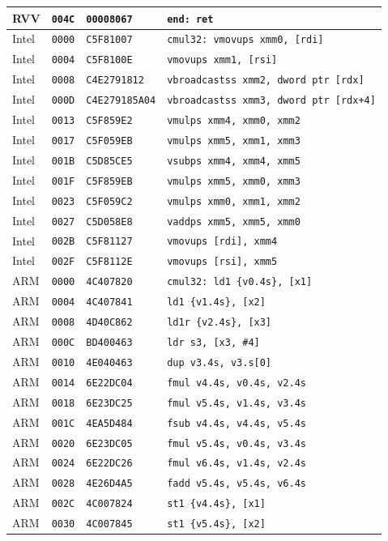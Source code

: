 \begin{table}[htbp]
\begin{tabular}{@{}l|l|l|p{7.2cm}@{}}
RVV & \texttt{004C} & \texttt{00008067} & \texttt{end: ret} \\
\midrule
Intel & \texttt{0000} & \texttt{C5F81007} & \texttt{cmul32: vmovups xmm0, [rdi]} \\
Intel & \texttt{0004} & \texttt{C5F8100E} & \texttt{vmovups xmm1, [rsi]} \\
Intel & \texttt{0008} & \texttt{C4E2791812} & \texttt{vbroadcastss xmm2, dword ptr [rdx]} \\
Intel & \texttt{000D} & \texttt{C4E279185A04} & \texttt{vbroadcastss xmm3, dword ptr [rdx+4]} \\
Intel & \texttt{0013} & \texttt{C5F859E2} & \texttt{vmulps xmm4, xmm0, xmm2} \\
Intel & \texttt{0017} & \texttt{C5F059EB} & \texttt{vmulps xmm5, xmm1, xmm3} \\
Intel & \texttt{001B} & \texttt{C5D85CE5} & \texttt{vsubps xmm4, xmm4, xmm5} \\
Intel & \texttt{001F} & \texttt{C5F859EB} & \texttt{vmulps xmm5, xmm0, xmm3} \\
Intel & \texttt{0023} & \texttt{C5F059C2} & \texttt{vmulps xmm0, xmm1, xmm2} \\
Intel & \texttt{0027} & \texttt{C5D058E8} & \texttt{vaddps xmm5, xmm5, xmm0} \\
Intel & \texttt{002B} & \texttt{C5F81127} & \texttt{vmovups [rdi], xmm4} \\
Intel & \texttt{002F} & \texttt{C5F8112E} & \texttt{vmovups [rsi], xmm5} \\
\midrule
ARM & \texttt{0000} & \texttt{4C407820} & \texttt{cmul32: ld1 \{v0.4s\}, [x1]} \\
ARM & \texttt{0004} & \texttt{4C407841} & \texttt{ld1 \{v1.4s\}, [x2]} \\
ARM & \texttt{0008} & \texttt{4D40C862} & \texttt{ld1r \{v2.4s\}, [x3]} \\
ARM & \texttt{000C} & \texttt{BD400463} & \texttt{ldr s3, [x3, \#4]} \\
ARM & \texttt{0010} & \texttt{4E040463} & \texttt{dup v3.4s, v3.s[0]} \\
ARM & \texttt{0014} & \texttt{6E22DC04} & \texttt{fmul v4.4s, v0.4s, v2.4s} \\
ARM & \texttt{0018} & \texttt{6E23DC25} & \texttt{fmul v5.4s, v1.4s, v3.4s} \\
ARM & \texttt{001C} & \texttt{4EA5D484} & \texttt{fsub v4.4s, v4.4s, v5.4s} \\
ARM & \texttt{0020} & \texttt{6E23DC05} & \texttt{fmul v5.4s, v0.4s, v3.4s} \\
ARM & \texttt{0024} & \texttt{6E22DC26} & \texttt{fmul v6.4s, v1.4s, v2.4s} \\
ARM & \texttt{0028} & \texttt{4E26D4A5} & \texttt{fadd v5.4s, v5.4s, v6.4s} \\
ARM & \texttt{002C} & \texttt{4C007824} & \texttt{st1 \{v4.4s\}, [x1]} \\
ARM & \texttt{0030} & \texttt{4C007845} & \texttt{st1 \{v5.4s\}, [x2]} \\
\bottomrule
\end{tabular}
\endgroup
\end{table}
\noindent{}\par
